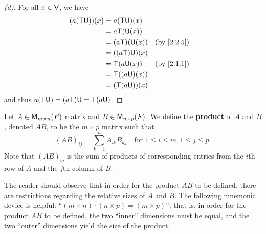 \begin{proof}[(d)]
	For all \(x \in \mathsf{V}\), we have
	\begin{align*}
		(a (\T \U))(x) & = a (\T \U)(x)                   \\
		               & = a \T(\U(x))                    \\
		               & = (a \T)(\U(x))  &  & \by{2.2.5} \\
		               & = ((a \T) \U)(x)                 \\
		               & = \T(a \U(x))    &  & \by{2.1.1} \\
		               & = \T((a \U)(x))                  \\
		               & = (\T (a \U))(x)
	\end{align*}
	and thus \(a (\mathsf{T} \mathsf{U}) = (a \mathsf{T}) \mathsf{U} = \mathsf{T} (a \mathsf{U})\).
\end{proof}

\begin{defn}\label{2.3.1}
	Let \(A \in \MS\) matrix and \(B \in \ms[n][p][\F]\).
	We define the \textbf{product} of \(A\) and \(B\), denoted \(AB\), to be the \(m \times p\) matrix such that
	\[
		(AB)_{i j} = \sum_{k = 1}^n A_{i k} B_{k j} \quad \text{for } 1 \leq i \leq m, 1 \leq j \leq p.
	\]
	Note that \((AB)_{i j}\) is the sum of products of corresponding entries from the \(i\)th row of \(A\) and the \(j\)th column of \(B\).
\end{defn}

\begin{note}
	The reader should observe that in order for the product \(AB\) to be defined, there are restrictions regarding the relative sizes of \(A\) and \(B\).
	The following mnemonic device is helpful:
	``\((m \times n) \cdot (n \times p) = (m \times p)\)'';
	that is, in order for the product \(AB\) to be defined, the two ``inner'' dimensions must be equal, and the two ``outer'' dimensions yield the size of the product.
\end{note}

